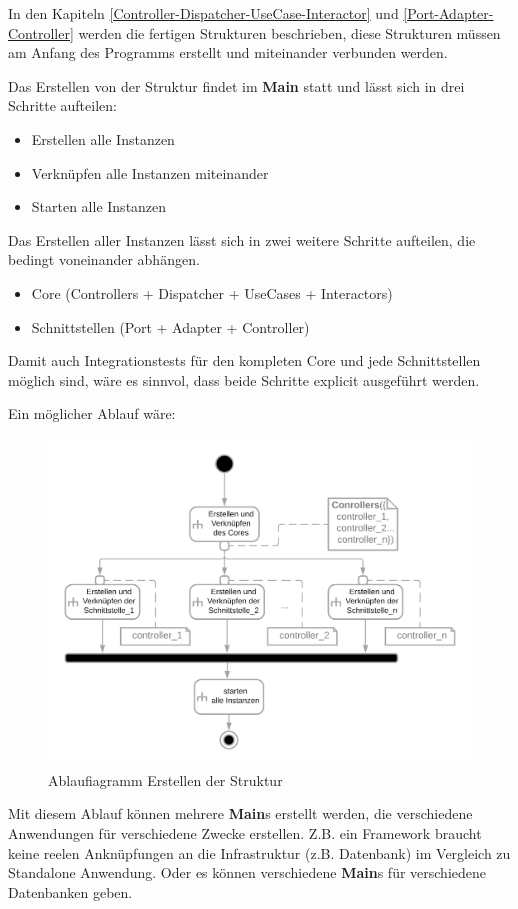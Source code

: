 In den Kapiteln \ref{Controller-Dispatcher-UseCase-Interactor} und \ref{Port-Adapter-Controller} 
werden die fertigen Strukturen beschrieben, diese Strukturen müssen am Anfang des Programms erstellt
und miteinander verbunden werden.

Das Erstellen von der Struktur findet im \textbf{Main} statt und lässt sich in drei Schritte aufteilen:
\begin{itemize}
    \item Erstellen alle Instanzen
    \item Verknüpfen alle Instanzen miteinander
    \item Starten alle Instanzen
\end{itemize}

Das Erstellen aller Instanzen lässt sich in zwei weitere Schritte aufteilen, die bedingt voneinander abhängen.
\begin{itemize}
    \item Core (Controllers + Dispatcher + UseCases + Interactors)
    \item Schnittstellen (Port + Adapter + Controller)
\end{itemize}

Damit auch Integrationstests für den kompleten Core und jede Schnittstellen möglich sind, wäre es sinnvol, dass beide Schritte
explicit ausgeführt werden.

Ein möglicher Ablauf wäre:
\begin{figure}[H]
    \centering
    \includegraphics[width=12cm]{./images/Erstellen AD.png}
     \caption[Ablaufiagramm Erstellen der Struktur]{Ablaufiagramm Erstellen der Struktur \footnotemark}
     \label{fig:ADCreate}
\end{figure}

Mit diesem Ablauf können mehrere \textbf{Main}s erstellt werden, die verschiedene Anwendungen für verschiedene Zwecke erstellen.
Z.B. ein Framework braucht keine reelen Anknüpfungen an die Infrastruktur (z.B. Datenbank) im Vergleich zu Standalone Anwendung.
Oder es können verschiedene \textbf{Main}s für verschiedene Datenbanken geben.
